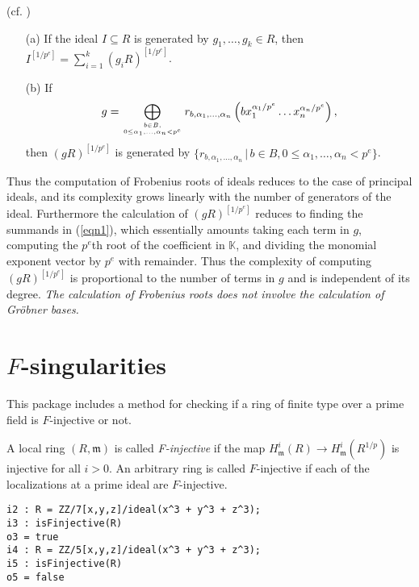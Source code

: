 \documentclass[11pt]{amsart}
\begin{document}
\begin{proposition}(cf. \cite[\S 5]{KatzmanParameterTestIdealOfCMRings})
\begin{enumerate}
\item[(a)] If the ideal $I\subseteq R$ is generated by $g_1, \dots, g_k\in R$, then $I^{[1/p^e]}=\sum_{i=1}^k (g_i R)^{[1/p^e]}$.
\item[(b)] If 
\begin{equation}\label{eqn1}
g=\bigoplus_{b\in B, \atop{0\leq \alpha_1, \dots, \alpha_n < p^e}} r_{b, \alpha_1, \dots, \alpha_n} \left(b x_1^{\alpha_1/p^e} \dots x_n^{\alpha_n/p^e}\right), 
\end{equation}
then $(gR)^{[1/p^e]}$ is generated by $\{ r_{b, \alpha_1, \dots, \alpha_n} \,|\, b\in B, 0\leq \alpha_1, \dots, \alpha_n < p^e \}$.
\end{enumerate}
\end{proposition}

Thus the computation of Frobenius roots of ideals reduces to the case of principal ideals, and its complexity grows linearly with the number of generators of the ideal.
Furthermore the calculation of  $(gR)^{[1/p^e]}$ reduces to finding the summands in (\ref{eqn1}), which essentially amounts 
taking each term in $g$, computing the $p^e$th root of the coefficient in $\mathbb{K}$, and dividing the monomial exponent vector by $p^e$ with remainder.
Thus the complexity of  computing $(gR)^{[1/p^e]}$ is proportional to the number of terms in $g$ and is independent of its degree.
\emph{The calculation of Frobenius roots does not involve the calculation of Gr\"obner bases.}



\section{$F$-singularities}

This package includes a method for checking if a ring of finite type over a prime field is $F$-injective or not.
\begin{definition}
A local ring $(R, \mathfrak{m})$ is called \emph{F-injective} if the map $H^{i}_{\mathfrak{m}}(R) \rightarrow H^{i}_{\mathfrak{m}}(R^{1/p})$ is injective for all $i >0$. An arbitrary ring is called $F$-injective if each of the localizations at a prime ideal are $F$-injective.
\end{definition}

\begin{verbatim}
i2 : R = ZZ/7[x,y,z]/ideal(x^3 + y^3 + z^3);
i3 : isFinjective(R)
o3 = true
i4 : R = ZZ/5[x,y,z]/ideal(x^3 + y^3 + z^3);
i5 : isFinjective(R)
o5 = false
\end{verbatim}
\end{document}
